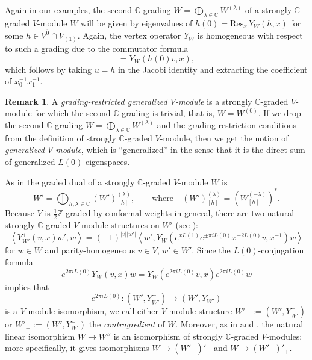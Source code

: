 \documentclass[11pt, reqno]{amsart}
\theoremstyle{definition}\newtheorem{defi}[thm]{Definition}
\theoremstyle{definition}\newtheorem{rem}[thm]{Remark}
\theoremstyle{definition}\newtheorem{exam}[thm]{Example}
\theoremstyle{definition}\newtheorem{assum}[thm]{Assumption}
\newcommand{\CC}{\mathbb{C}}
\newcommand{\ZZ}{\mathbb{Z}}
\begin{document}
Again in our examples, the second $\CC$-grading $W=\bigoplus_{\lambda\in\CC} W^{(\lambda)}$ of a strongly $\CC$-graded $V$-module $W$ will be given by eigenvalues of $h(0)=\mathrm{Res}_x\,Y_W(h,x)$ for some $h\in V^{\overline{0}}\cap V_{(1)}$. Again, the vertex operator $Y_W$ is homogeneous with respect to such a grading due to the commutator formula
\begin{equation*}
[h(0), Y_W(v,x)] = Y_W(h(0)v,x),
\end{equation*}
which follows by taking $u=h$ in the Jacobi identity and extracting the coefficient of $x_0^{-1} x_1^{-1}$.

\begin{rem}
A \textit{grading-restricted generalized $V$-module} is a strongly $\CC$-graded $V$-module for which the second $\CC$-grading is trivial, that is, $W=W^{(0)}$. If we drop the second $\CC$-grading $W=\bigoplus_{\lambda\in\CC} W^{(\lambda)}$ and the grading restriction conditions from the definition of strongly $\CC$-graded $V$-module, then we get the notion of \textit{generalized $V$-module}, which is ``generalized'' in the sense that it is the direct sum of generalized $L(0)$-eigenspaces.
\end{rem}

As in \cite[Definition 2.32]{HLZ1} the graded dual of a strongly $\CC$-graded $V$-module $W$ is
\begin{equation*}
W'=\bigoplus_{h,\lambda\in\CC} (W')_{[h]}^{(\lambda)},\qquad\text{where}\quad (W')_{[h]}^{(\lambda)}=(W^{(-\lambda)}_{[h]})^*.
\end{equation*}
Because $V$ is $\frac{1}{2}\ZZ$-graded by conformal weights in general, there are two natural strongly $\CC$-graded $V$-module structures on $W'$ (see \cite[Section 3.1]{CKM-exts}):
\begin{equation}\label{eqn:contra_action}
\left\langle Y^{\pm}_{W'}(v,x)w',w\right\rangle =(-1)^{\vert v\vert\vert w'\vert}\left\langle w', Y_W(e^{xL(1)}e^{\pm\pi i L(0)} x^{-2L(0)} v, x^{-1})w\right\rangle
\end{equation}
for $w\in W$ and parity-homogeneous $v\in V$, $w'\in W'$. Since the $L(0)$-conjugation formula
\begin{equation*}
e^{2\pi i L(0)} Y_W(v,x)w=Y_W(e^{2\pi i L(0)} v,x)e^{2\pi i L(0)} w
\end{equation*}
implies that 
\begin{equation*}
e^{2\pi i L(0)}: (W', Y_{W'}^+) \longrightarrow (W', Y_{W'}^-)
\end{equation*}
is a $V$-module isomorphism, we call either $V$-module structure $W'_+ := (W',Y_{W'}^+)$ or $W'_- := (W',Y_{W'}^-)$ the \textit{contragredient} of $W$. Moreover, as in \cite[Proposition 5.3.1]{FHL} and \cite[Theorem 2.34]{HLZ1}, the natural linear isomorphism $W\rightarrow W''$ is an isomorphism of strongly $\CC$-graded $V$-modules; more specifically, it gives isomorphisms $W\rightarrow (W'_+)'_-$ and $W\rightarrow (W'_-)'_+$.
\end{document}
